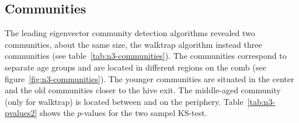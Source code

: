 \subsection{Communities}
The leading eigenvector community detection algorithms revealed two communities, about the same size, the walktrap algorithm instead three communities (see table~\ref{tab:n3-communities}).
The communities correspond to separate age groups and are located in different regions on the comb (see figure~\ref{fig:n3-communities}). The younger communities are situated in the center and the old communities closer to the hive exit. The middle-aged community (only for walktrap) is located between and on the periphery. Table~\ref{tab:n3-pvalues2} shows the $p$-values for the two sampel KS-test.




